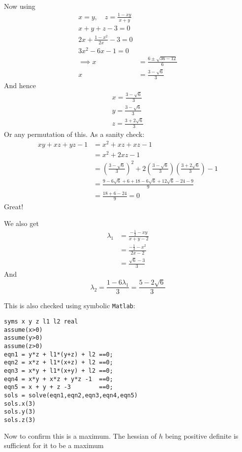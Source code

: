 \documentclass{X:/Documents/Coding/Latex/myassignment}
\begin{document}
\begin{enumerate}
	Now using
	\begin{align*}
		x = y, \quad z=\frac{1-xy}{x+y}\\
		 x + y + z - 3 = 0\\
		 2x + \frac{1-x^2}{2x} -3 =0\\
		 3x^2 - 6x - 1 = 0\\
		 \implies x &= \frac{6 \pm \sqrt{36 - 12}}{6}\\
		 x&= \frac{3 - \sqrt{6}}{3}
	\end{align*}
	And hence
	\begin{align*}
		x = \frac{3-\sqrt{6}}{3}\\
		y = \frac{3-\sqrt{6}}{3}\\
		z = \frac{3 + 2\sqrt{6}}{3}
	\end{align*}
	Or any permutation of this.
	As a sanity check:
	\begin{align*}
		xy + xz + yz -1 &= x^2 + xz + xz - 1\\
		&= x^2 + 2xz -1\\
		&=\left(\frac{3-\sqrt{6}}{3}\right)^2 + 2\left(\frac{3-\sqrt{6}}{3}\right)\left(\frac{3 +2\sqrt{6}}{3}\right) -1 \\
		&=\frac{9 - 6\sqrt{6} + 6 + 18 -6\sqrt{6} + 12\sqrt{6} - 24 -9}{9}\\
		&=\frac{18+6-24}{9} = 0
	\end{align*}
	Great!

	We also get
	\begin{align*}
		\lambda_1 &= \frac{-\frac13 - xy}{x+y-2} \\
		&= \frac{-\frac13 - x^2}{2x-2}\\
		&= \frac{\sqrt{6} -3  }{3}
	\end{align*}
	And
	\[\lambda_2 = \frac{1-6\lambda_1}{3} = \frac{5 - 2\sqrt{6}}{3}\]

	This is also checked using symbolic \verb|Matlab|:
	\begin{lstlisting}
syms x y z l1 l2 real
assume(x>0)
assume(y>0)
assume(z>0)
eqn1 = y*z + l1*(y+z) + l2 ==0;
eqn2 = x*z + l1*(x+z) + l2 ==0;
eqn3 = x*y + l1*(x+y) + l2 ==0;
eqn4 = x*y + x*z + y*z -1  ==0;
eqn5 = x + y + z -3        ==0;
sols = solve(eqn1,eqn2,eqn3,eqn4,eqn5)
sols.x(3)
sols.y(3)
sols.z(3)
	\end{lstlisting}

	Now to confirm this is a maximum.
	The hessian of $h$ being positive definite is sufficient for it to be a maximum


\end{enumerate}
\end{document}
